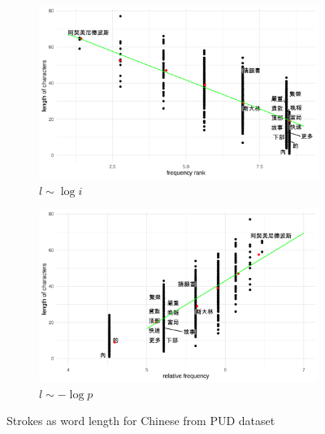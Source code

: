 \begin{figure}[H]
  \centering
  \begin{subfigure}[b]{0.48\textwidth}
    \centering
    \includegraphics[width=\textwidth]{plots/Chinese_logi_cl_PUD_strokes.pdf}
    \caption{$l \sim \log i$}
  \end{subfigure}
  \hfill
  \begin{subfigure}[b]{0.48\textwidth}
    \centering
    \includegraphics[width=\textwidth]{plots/Chinese_logp_cl_PUD_strokes.pdf}
    \caption{$l \sim -\log p$}
  \end{subfigure}
  \caption{Strokes as word length for Chinese from PUD dataset}
\end{figure}
